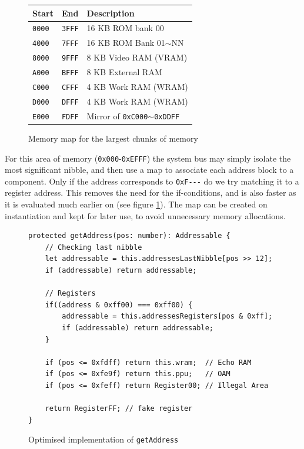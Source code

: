 \documentclass[11pt]{report}
\begin{document}
\begin{figure}[h]
    \centering
    \caption{Memory map for the largest chunks of memory \cite{memorymap}}
    \begin{tabular}{|l|l|l|}
    \hline
    \textbf{Start} & \textbf{End} & \textbf{Description} \\ \hline
    \texttt{0000} & \texttt{3FFF} & 16 KB ROM bank 00 \\ \hline
    \texttt{4000} & \texttt{7FFF} & 16 KB ROM Bank 01$\sim$NN \\ \hline
    \texttt{8000} & \texttt{9FFF} & 8 KB Video RAM (VRAM) \\ \hline
    \texttt{A000} & \texttt{BFFF} & 8 KB External RAM \\ \hline
    \texttt{C000} & \texttt{CFFF} & 4 KB Work RAM (WRAM) \\ \hline
    \texttt{D000} & \texttt{DFFF} & 4 KB Work RAM (WRAM) \\ \hline
    \texttt{E000} & \texttt{FDFF} & Mirror of \texttt{0xC000}$\sim$\texttt{0xDDFF} \\ \hline
    \end{tabular}
\end{figure}

For this area of memory (\texttt{0x000}-\texttt{0xEFFF}) the system bus may simply isolate the most significant nibble, and then use a map to associate each address block to a component. Only if the address corresponds to \texttt{0xF-{}-{}-} do we try matching it to a register address. This removes the need for the if-conditions, and is also faster as it is evaluated much earlier on (see figure \ref{fig:getaddress-after}). The map can be created on instantiation and kept for later use, to avoid unnecessary memory allocations.

\begin{figure}[h]
    \begin{verbatim}
protected getAddress(pos: number): Addressable {
    // Checking last nibble
    let addressable = this.addressesLastNibble[pos >> 12];
    if (addressable) return addressable;

    // Registers
    if((address & 0xff00) === 0xff00) {
        addressable = this.addressesRegisters[pos & 0xff];
        if (addressable) return addressable;
    }

    if (pos <= 0xfdff) return this.wram;  // Echo RAM
    if (pos <= 0xfe9f) return this.ppu;   // OAM
    if (pos <= 0xfeff) return Register00; // Illegal Area

    return RegisterFF; // fake register
}
    \end{verbatim}
    \caption{Optimised implementation of \texttt{getAddress}}
    \label{fig:getaddress-after}
\end{figure}
\end{document}
